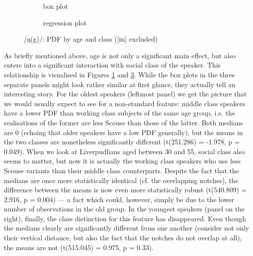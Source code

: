 \begin{figure}[h]
	\centering
	\begin{subfigure}{.49\textwidth}
		\centering
			\resizebox{\linewidth}{!}{} 
		\caption{box plot}
		\label{fig.box.ng.ageclass}
	\end{subfigure}
	\begin{subfigure}{.49\textwidth}
		\centering
			\resizebox{\linewidth}{!}{}
		\caption{regression plot}
		\label{fig.scatter.ng.ageclass}
	\end{subfigure}
	\caption{/ŋ(g)/: PDF by age and class ([ɪn] excluded)}
\end{figure}

As briefly mentioned above, age is not only a significant main effect, but also enters into a significant interaction with social class of the speaker.
This relationship is visualised in Figures \ref{fig.box.ng.ageclass} and \ref{fig.scatter.ng.ageclass}.
While the box plots in the three separate panels might look rather similar at first glance, they actually tell an interesting story.
For the oldest speakers (leftmost panel) we get the picture that we would usually expect to see for a non-standard feature: middle class speakers have a lower PDF than working class subjects of the same age group, i.e. the realisations of the former are less Scouse than those of the latter.
Both medians are 0 (echoing that older speakers have a low PDF generally), but the means in the two classes are nonetheless significantly different (t(251.286) = -1.978, p = 0.049).
When we look at Liverpudlians aged between 30 and 55, social class also seems to matter, but now it is actually the working class speakers who use less Scouse variants than their middle class counterparts.
Despite the fact that the medians are once more statistically identical (cf. the overlapping notches), the difference between the means is now even more statistically robust (t(540.809) = 2.916, p = 0.004) --- a fact which could, however, simply be due to the lower number of observations in the old group.
In the youngest speakers (panel on the right), finally, the class distinction for this feature has disappeared.
Even though the medians clearly are significantly different from one another (consider not only their vertical distance, but also the fact that the notches do not overlap at all), the means are not (t(515.045) = 0.975, p = 0.33).

